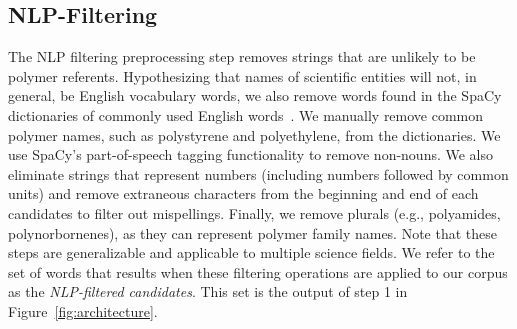 \subsection{NLP-Filtering}\label{sec:filter}

The NLP filtering preprocessing step removes strings that are unlikely to be polymer referents. 
Hypothesizing that names of scientific entities will not, in general, be English
vocabulary words, we also remove words found in the SpaCy dictionaries
of commonly used English words~\cite{choi2015depends}. We manually remove common polymer
names, such as polystyrene and polyethylene, from the dictionaries.
We use
SpaCy's part-of-speech tagging functionality to remove non-nouns.  
We also eliminate strings that represent numbers (including numbers followed by common units) and remove extraneous characters from the beginning and end of each candidates to filter out mispellings.
Finally, we remove plurals (e.g.,
polyamides, polynorbornenes), as they can represent polymer family names.
Note that these steps are generalizable and applicable to multiple science fields.
We refer to the set of words that results when these filtering operations are applied to our corpus 
as the \emph{NLP-filtered candidates}.
This set is the output of step 1 in Figure~\ref{fig:architecture}.

